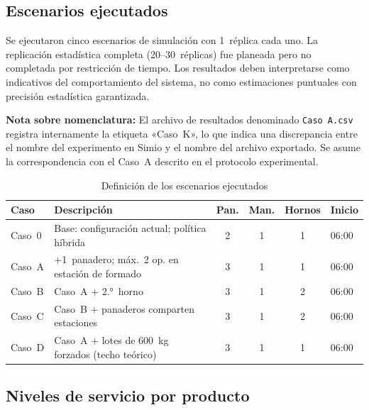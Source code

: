 \documentclass[12pt]{article}
\begin{document}
\subsection{Escenarios ejecutados}

Se ejecutaron cinco escenarios de simulación con 1~réplica cada uno. La replicación estadística completa (20--30~réplicas) fue planeada pero no completada por restricción de tiempo. Los resultados deben interpretarse como indicativos del comportamiento del sistema, no como estimaciones puntuales con precisión estadística garantizada.

\textbf{Nota sobre nomenclatura:} El archivo de resultados denominado \texttt{Caso A.csv} registra internamente la etiqueta «Caso~K», lo que indica una discrepancia entre el nombre del experimento en Simio y el nombre del archivo exportado. Se asume la correspondencia con el Caso~A descrito en el protocolo experimental.

\begin{table}[H]
\centering
\caption{Definición de los escenarios ejecutados}
\label{tab:escenarios-acad}
\renewcommand{\arraystretch}{1.3}
\begin{tabularx}{\textwidth}{lXcccl}
\toprule
\rowcolor{tabhead}
\color{white}\textbf{Caso} &
\color{white}\textbf{Descripción} &
\color{white}\textbf{Pan.} &
\color{white}\textbf{Man.} &
\color{white}\textbf{Hornos} &
\color{white}\textbf{Inicio} \\
\midrule
\rowcolor{tabrow} Caso~0 & Base: configuración actual; política híbrida & 2 & 1 & 1 & 06:00 \\
Caso~A & +1~panadero; máx.~2 op. en estación de formado & 3 & 1 & 1 & 06:00 \\
\rowcolor{tabrow} Caso~B & Caso~A $+$ 2.°~horno & 3 & 1 & 2 & 06:00 \\
Caso~C & Caso~B $+$ panaderos comparten estaciones & 3 & 1 & 2 & 06:00 \\
\rowcolor{tabrow} Caso~D & Caso~A $+$ lotes de 600~kg forzados (techo teórico) & 3 & 1 & 1 & 06:00 \\
\bottomrule
\end{tabularx}
\end{table}

\subsection{Niveles de servicio por producto}
\end{document}
